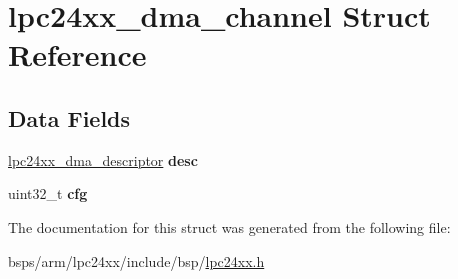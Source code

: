 \hypertarget{structlpc24xx__dma__channel}{}\section{lpc24xx\+\_\+dma\+\_\+channel Struct Reference}
\label{structlpc24xx__dma__channel}
\subsection*{Data Fields}
\begin{DoxyCompactItemize}
\item 
\mbox{\label{structlpc24xx__dma__channel_ad4a6f3022ea72812b018c743f771565a}} 
\mbox{\hyperlink{structlpc24xx__dma__descriptor}{lpc24xx\+\_\+dma\+\_\+descriptor}} {\bfseries desc}
\item 
\mbox{\label{structlpc24xx__dma__channel_a81d0060e1d93d5abd23efb80e754f948}} 
uint32\+\_\+t {\bfseries cfg}
\end{DoxyCompactItemize}


The documentation for this struct was generated from the following file\+:\begin{DoxyCompactItemize}
\item 
bsps/arm/lpc24xx/include/bsp/\mbox{\hyperlink{lpc24xx_8h}{lpc24xx.\+h}}\end{DoxyCompactItemize}
